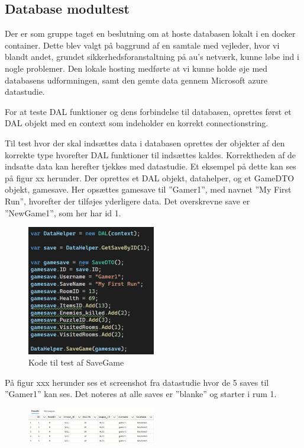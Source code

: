 \subsection{Database modultest}
Der er som gruppe taget en beslutning om at hoste databasen lokalt i en docker container. Dette blev valgt på baggrund af en samtale med vejleder, hvor vi blandt andet, grundet sikkerhedsforanstaltning på au’s netværk, kunne løbe ind i nogle problemer.
Den lokale hosting medførte at vi kunne holde øje med databasens udformningen, samt den gemte data gennem Microsoft azure datastudie.

For at teste DAL funktioner og dens forbindelse til databasen, oprettes først et DAL objekt med en context som indeholder en korrekt connectionstring.

Til test hvor der skal indsættes data i databasen oprettes der objekter af den korrekte type hvorefter DAL funktioner til indsættes kaldes. Korrektheden af de indsatte data kan herefter tjekkes med datastudie.
Et eksempel på dette kan ses på figur xx herunder.
Der oprettes et DAL objekt, datahelper, og et GameDTO objekt, gamesave.
Her opsættes gamesave til ”Gamer1”, med navnet ”My First Run”, hvorefter der tilføjes yderligere data. Det overskrevne save er ”NewGame1”, som her har id 1.

\begin{figure}[H]
\centering
\includegraphics[width = 0.5\textwidth]{02-Body/Images/DAL-Database/NewSave.png}
\caption{Kode til test af SaveGame}
\label{fig:SaveGame-test}
\end{figure}

På figur xxx herunder ses et screenshot fra datastudie hvor de 5 saves til ”Gamer1” kan ses.
Det noteres at alle saves er ”blanke” og starter i rum 1.

\begin{figure}[H]
\centering
\includegraphics[width = 0.5\textwidth]{02-Body/Images/DAL-Database/DatastudieFørIndsættelse.png}
\caption{}
\label{fig:}
\end{figure}

